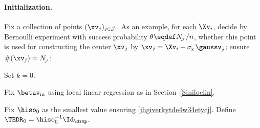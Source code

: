 
\paragraph{Initialization.}
\begin{mylist}

\item 
Fix a collection of points \( (\xv_{j})_{j \in \JJJ} \).
As an example, for each \( \Xv_{i} \), 
decide by Bernoulli experiment with success probability \( \theta \eqdef \nJJJ/n \), 
whether this point is used for 
constructing the center \( \xv_{j} \) by \( \xv_{j} = \Xv_{i} + \sigmaX \gaussv_{j} \);
ensure \( \#(\xv_{j}) = \nJJJ \);

\item
Set \( k=0 \).

\item
Fix \( \betav_{\init} \) using local linear regression as
in Section~\ref{Siniloclin}.

\item
Fix \( \hiso_{0} \) as the smallest value ensuring \eqref{jhgiverkytde4w34etycj}.
Define \( \TEDR_{0} = \hiso_{0}^{-1} \Id_{\dimp} \).


\end{mylist}
